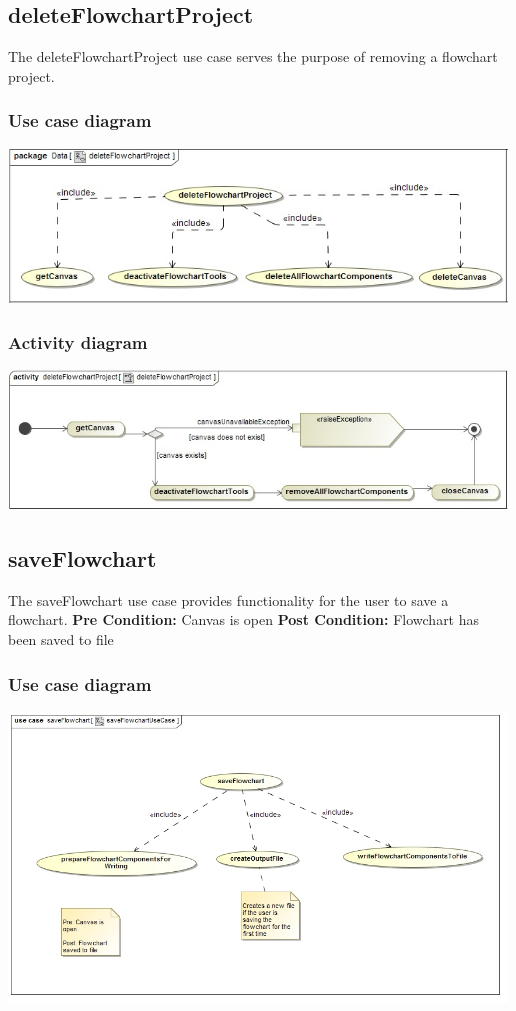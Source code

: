 \documentclass[11pt,a4paper,titlepage]{article}
\begin{document}
\subsection{deleteFlowchartProject}
The deleteFlowchartProject use case serves the purpose of removing a flowchart project.

\subsubsection{Use case diagram}
\includegraphics[width=500px]{deleteFlowchartProjectUseCase.jpg}

\subsubsection{Activity diagram}
\includegraphics[width=500px]{deleteFlowchartProject.jpg}

\subsection{saveFlowchart}
The saveFlowchart use case provides functionality for the user to save a flowchart.\newline\newline
\textbf{Pre Condition:} Canvas is open\newline\newline
\textbf{Post Condition:} Flowchart has been saved to file

\subsubsection{Use case diagram}
\includegraphics[width=500px]{saveFlowchartUseCase.jpg}
\end{document}
